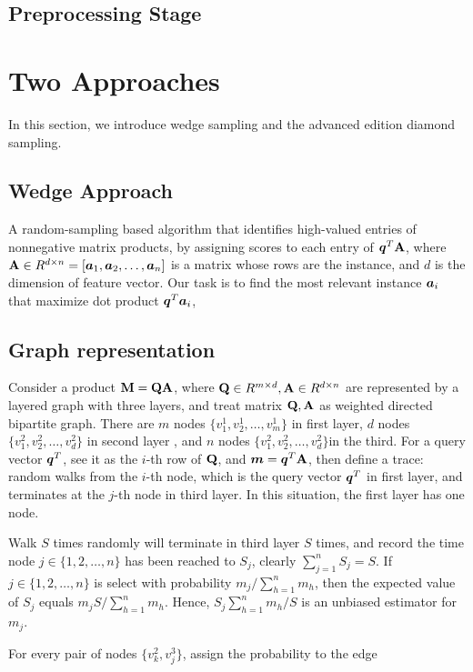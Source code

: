 \documentclass{article}
\newcommand{\V}[1]{{\bm{{\MakeLowercase{#1}}}}}%
\newcommand{\M}[1]{{\bm{\mathbf{\MakeUppercase{#1}}}}}%
\begin{document}
\subsection{Preprocessing Stage}

\section{Two Approaches}
In this section, we introduce wedge sampling and the advanced edition diamond sampling.
\subsection{Wedge Approach}
A random-sampling based algorithm that identifies high-valued entries of nonnegative matrix products, by assigning scores to each entry of $\V{q}^T\M{A}$, where $\M{A}\in R^{d\times n}=[\V{a}_1,\V{a}_2,\ldots,\V{a}_n]$ is a matrix whose rows are the instance, and $d$ is the dimension of feature vector. Our task is to find the most relevant instance $\V{a}_i$ that maximize dot product $\V{q}^T\V{a}_i$,
\subsection{Graph representation}

Consider a product $\M{m} = \M{q}\M{A}$, where $\M{q}\in R^{m\times d},\M{A}\in R^{d\times n}$ are represented by a layered graph with three layers, and treat matrix $\M{q},\M{A}$ as weighted directed bipartite graph. There are $m$ nodes $\{v_1^1,v_2^1,\ldots,v_m^1\}$ in first layer, $d$ nodes $\{v_1^2,v_2^2,\ldots,v_d^2\}$ in second layer  , and $n$ nodes $\{v_1^2,v_2^2,\ldots,v_d^2\}$in the third. For a query vector $\V{q}^T$, see it as the $i$-th row of $\M{Q}$, and $\V{m} = \V{q}^T\M{A}$, then define a trace: random walks from the $i$-th node, which is the query vector $\V{q}^T$ in first layer, and terminates at the $j$-th node in third layer. In this situation, the first layer has one node.

Walk $S$ times randomly will terminate in third layer $S$ times, and record the time node $j\in\{1,2,\ldots,n\}$ has been reached to $S_j$, clearly $\sum_{j=1}^{n}S_j = S$. If $j\in\{1,2,\ldots,n\}$ is select with probability $m_j/\sum_{h=1}^{n}m_h $, then the expected value of $S_j$ equals $m_jS/\sum_{h=1}^{n}m_h$. Hence, $S_j\sum_{h=1}^{n}m_h/S$ is an unbiased estimator for $m_j$.

For every pair of nodes $\{v_k^2,v_j^3\}$, assign the probability to the edge
\end{document}
